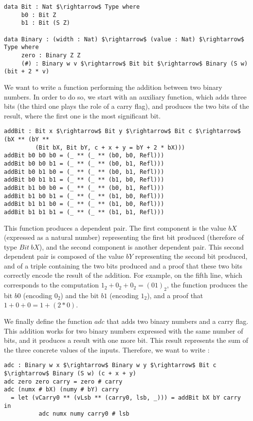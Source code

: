 \begin{lstlisting}
data Bit : Nat $\rightarrow$ Type where
     b0 : Bit Z
     b1 : Bit (S Z)
     
data Binary : (width : Nat) $\rightarrow$ (value : Nat) $\rightarrow$ Type where
     zero : Binary Z Z
     (#) : Binary w v $\rightarrow$ Bit bit $\rightarrow$ Binary (S w) (bit + 2 * v)
\end{lstlisting}

We want to write a function performing the addition between two binary numbers. In order to do so, we start with an auxiliary function, which adds three bits
(the third one plays the role of a carry flag), and produces the two bits of
the result, where the first one is the most significant bit. 

\begin{lstlisting}
addBit : Bit x $\rightarrow$ Bit y $\rightarrow$ Bit c $\rightarrow$ (bX ** (bY ** 
         (Bit bX, Bit bY, c + x + y = bY + 2 * bX)))
addBit b0 b0 b0 = (_ ** (_ ** (b0, b0, Refl)))
addBit b0 b0 b1 = (_ ** (_ ** (b0, b1, Refl)))
addBit b0 b1 b0 = (_ ** (_ ** (b0, b1, Refl)))
addBit b0 b1 b1 = (_ ** (_ ** (b1, b0, Refl)))
addBit b1 b0 b0 = (_ ** (_ ** (b0, b1, Refl)))
addBit b1 b0 b1 = (_ ** (_ ** (b1, b0, Refl)))
addBit b1 b1 b0 = (_ ** (_ ** (b1, b0, Refl)))
addBit b1 b1 b1 = (_ ** (_ ** (b1, b1, Refl)))
\end{lstlisting}

This function produces a dependent pair. The first component is the value $bX$ (expressed as a natural number) representing the first bit produced (therefore of type $Bit\ bX$), and the second component is another dependent pair. This second dependent pair is composed of the value $bY$ representing the second bit produced, and of a triple containing the two bits produced and a proof that these two bits correctly encode the result of the addition.
For example, on the fifth line, which corresponds to the computation $1_2 + 0_2 + 0_2 = (01)_2$, the function produces the bit $b0$ (encoding $0_2$) and the bit $b1$ (encoding $1_2$), and a proof that $1 + 0 + 0 = 1 + (2*0)$.

We finally define the function $adc$ that adds two binary numbers and a carry flag. This addition works for two binary numbers expressed with the same number of bits, and it produces a result with one more bit. This result represents the sum of the three concrete values of the inputs. Therefore, we want to write :

\begin{lstlisting}
adc : Binary w x $\rightarrow$ Binary w y $\rightarrow$ Bit c $\rightarrow$ Binary (S w) (c + x + y)
adc zero zero carry = zero # carry
adc (numx # bX) (numy # bY) carry
  = let (vCarry0 ** (vLsb ** (carry0, lsb, _))) = addBit bX bY carry in
          adc numx numy carry0 # lsb
\end{lstlisting}


